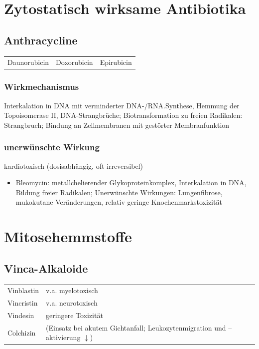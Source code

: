 \documentclass[10pt,a4paper]{report}
\begin{document}
\section{Zytostatisch wirksame Antibiotika} %
\label{sec:zytostatisch_wirksame_antibiotika}
\subsection{Anthracycline} %
\label{sub:anthracycline}
\begin{tabularx}{\textwidth}{XXX}
Daunorubicin&Doxorubicin&Epirubicin\\ 
\end{tabularx}
\subsubsection{Wirkmechanismus} %
\label{ssub:wirkmechanismus}
Interkalation in DNA mit verminderter DNA-/RNA.Synthese, Hemmung der Topoisomerase II, DNA-Strangbrüche; Biotransformation zu freien Radikalen: Strangbruch; Bindung an Zellmembranen mit gestörter Membranfunktion
\subsubsection{unerwünschte Wirkung} %
\label{ssub:unerw_nschte_wirk}
kardiotoxisch (dosisabhängig, oft irreversibel)
\begin{itemize}
	\item Bleomycin: metallchelierender Glykoproteinkomplex, Interkalation in DNA, Bildung freier Radikalen; Unerwünschte Wirkungen: Lungenfibrose, mukokutane Veränderungen, relativ geringe Knochenmarkstoxizität
\end{itemize}
\section{Mitosehemmstoffe} %
\label{sec:mitosehemmstoffe}
\subsection{Vinca-Alkaloide} %
\label{sub:vinca_al}
\begin{tabularx}{\textwidth}{XX}
Vinblastin&v.a. myelotoxisch\\
Vincristin& v.a. neurotoxisch\\
Vindesin& geringere Toxizität\\
Colchizin& (Einsatz bei akutem Gichtanfall; Leukozytenmigration und –aktivierung $\downarrow$)\\ 
\end{tabularx}
\end{document}
